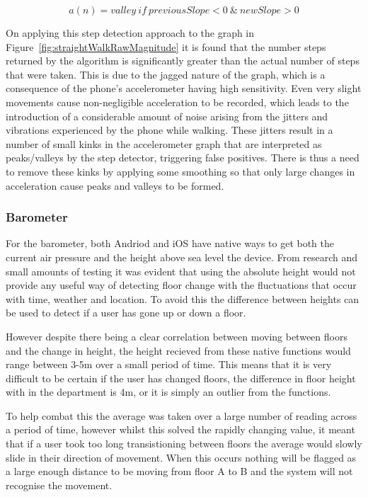 \documentclass[12pt,a4paper]{report}
\begin{document}
\begin{equation}\label{eq:valleyDetection}
a(n) = valley\ if\ previousSlope < 0\ \&\ newSlope > 0
\end{equation}

On applying this step detection approach to the graph in Figure~\ref{fig:straightWalkRawMagnitude} it is found that the number steps returned by the algorithm is significantly greater than the actual number of steps that were taken. This is due to the jagged nature of the graph, which is a consequence of the phone's accelerometer having high sensitivity. Even very slight movements cause non-negligible acceleration to be recorded, which leads to the introduction of a considerable amount of noise arising from the jitters and vibrations experienced by the phone while walking. These jitters result in a number of small kinks in the accelerometer graph that are interpreted as peaks/valleys by the step detector, triggering false positives. There is thus a need to remove these kinks by applying some smoothing so that only large changes in acceleration cause peaks and valleys to be formed.  

\subsubsection{Barometer}

For the barometer, both Andriod and iOS have native ways to get both the current air pressure and the height above sea level the device. From research and small amounts of testing it was evident that using the absolute height would not provide any useful way of detecting floor change with the fluctuations that occur with time, weather and location. To avoid this the difference between heights can be used to detect if a user has gone up or down a floor. 

However despite there being a clear correlation between moving between floors and the change in height, the height recieved from these native functions would range between 3-5m over a small period of time. This means that it is very difficult to be certain if the user has changed floors, the difference in floor height with in the department is 4m, or it is simply an outlier from the functions. 

To help combat this the average was taken over a large number of reading across a period of time, however whilst this solved the rapidly changing value, it meant that if a user took too long transistioning between floors the average would slowly slide in their direction of movement. When this occurs nothing will be flagged as a large enough distance to be moving from floor A to B and the system will not recognise the movement. 
\end{document}
